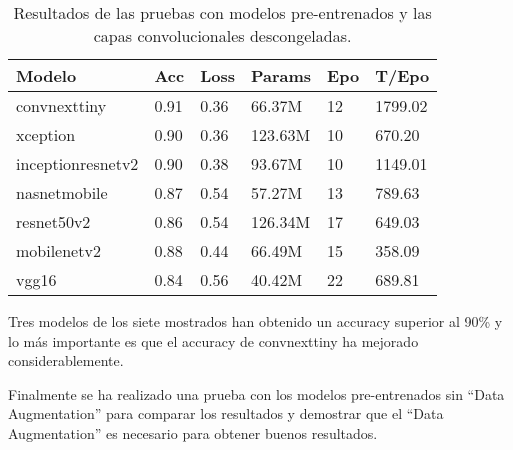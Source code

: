 \documentclass[10pt,a4paper,twocolumn,twoside]{article}
\begin{document}
\begin{table}[h]
  \centering
  \begin{tabular}{@{}llllll@{}}
    \toprule
    \textbf{Modelo}        & \textbf{Acc} & \textbf{Loss} & \textbf{Params} & \textbf{Epo} & \textbf{T/Epo} \\ 
    \midrule
    convnexttiny           & 0.91         & 0.36          & 66.37M          & 12           & 1799.02        \\
    xception               & 0.90         & 0.36          & 123.63M         & 10           & 670.20         \\
    inceptionresnetv2      & 0.90         & 0.38          & 93.67M          & 10           & 1149.01        \\
    nasnetmobile           & 0.87         & 0.54          & 57.27M          & 13           & 789.63         \\
    resnet50v2             & 0.86         & 0.54          & 126.34M         & 17           & 649.03         \\
    mobilenetv2            & 0.88         & 0.44          & 66.49M          & 15           & 358.09         \\
    vgg16                  & 0.84         & 0.56          & 40.42M          & 22           & 689.81         \\
    \bottomrule
  \end{tabular}
  \caption{Resultados de las pruebas con modelos pre-entrenados y las capas convolucionales descongeladas.}
  \label{table:pretrained_models_unfrozen}
\end{table}

Tres modelos de los siete mostrados han obtenido un accuracy superior al 90\% y lo más importante es que el
accuracy de convnexttiny ha mejorado considerablemente.

Finalmente se ha realizado una prueba con los modelos pre-entrenados sin ``Data Augmentation'' para comparar los resultados
y demostrar que el ``Data Augmentation'' es necesario para obtener buenos resultados.
\end{document}
